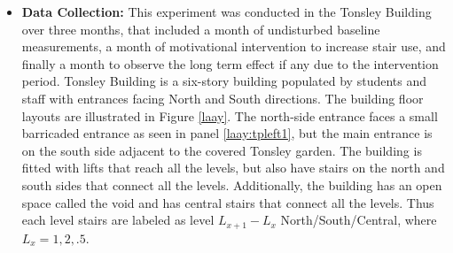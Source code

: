 \begin{itemize}

 \item\textbf{Data Collection: }
This experiment was conducted in the Tonsley Building over three months, that included a month of undisturbed baseline measurements, a month of motivational intervention to increase stair use, and finally a month to observe the long term effect if any due to the intervention period. Tonsley Building is a six-story building populated by students and staff with entrances facing North and South directions. The building floor layouts are illustrated in Figure \ref{laay}. The north-side entrance faces a small barricaded entrance as seen in panel \ref{laay:tpleft1}, but the main entrance is on the south side adjacent to the covered Tonsley garden. The building is fitted with lifts that reach all the levels, but also have stairs on the north and south sides that connect all the levels. Additionally, the building has an open space called the void and has central stairs that connect all the levels. Thus each level stairs are labeled as level $L_{x+1}-L_x$ North/South/Central, where $L_x = 1,2,.5$. 



\end{itemize}
